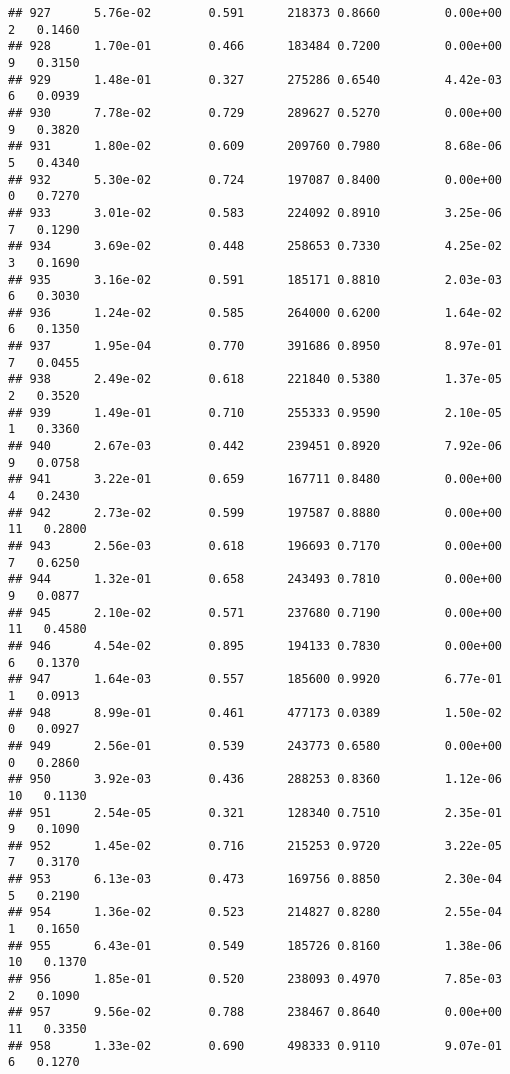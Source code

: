\documentclass[
]{article}
\begin{document}
\begin{verbatim}
## 927      5.76e-02        0.591      218373 0.8660         0.00e+00   2   0.1460
## 928      1.70e-01        0.466      183484 0.7200         0.00e+00   9   0.3150
## 929      1.48e-01        0.327      275286 0.6540         4.42e-03   6   0.0939
## 930      7.78e-02        0.729      289627 0.5270         0.00e+00   9   0.3820
## 931      1.80e-02        0.609      209760 0.7980         8.68e-06   5   0.4340
## 932      5.30e-02        0.724      197087 0.8400         0.00e+00   0   0.7270
## 933      3.01e-02        0.583      224092 0.8910         3.25e-06   7   0.1290
## 934      3.69e-02        0.448      258653 0.7330         4.25e-02   3   0.1690
## 935      3.16e-02        0.591      185171 0.8810         2.03e-03   6   0.3030
## 936      1.24e-02        0.585      264000 0.6200         1.64e-02   6   0.1350
## 937      1.95e-04        0.770      391686 0.8950         8.97e-01   7   0.0455
## 938      2.49e-02        0.618      221840 0.5380         1.37e-05   2   0.3520
## 939      1.49e-01        0.710      255333 0.9590         2.10e-05   1   0.3360
## 940      2.67e-03        0.442      239451 0.8920         7.92e-06   9   0.0758
## 941      3.22e-01        0.659      167711 0.8480         0.00e+00   4   0.2430
## 942      2.73e-02        0.599      197587 0.8880         0.00e+00  11   0.2800
## 943      2.56e-03        0.618      196693 0.7170         0.00e+00   7   0.6250
## 944      1.32e-01        0.658      243493 0.7810         0.00e+00   9   0.0877
## 945      2.10e-02        0.571      237680 0.7190         0.00e+00  11   0.4580
## 946      4.54e-02        0.895      194133 0.7830         0.00e+00   6   0.1370
## 947      1.64e-03        0.557      185600 0.9920         6.77e-01   1   0.0913
## 948      8.99e-01        0.461      477173 0.0389         1.50e-02   0   0.0927
## 949      2.56e-01        0.539      243773 0.6580         0.00e+00   0   0.2860
## 950      3.92e-03        0.436      288253 0.8360         1.12e-06  10   0.1130
## 951      2.54e-05        0.321      128340 0.7510         2.35e-01   9   0.1090
## 952      1.45e-02        0.716      215253 0.9720         3.22e-05   7   0.3170
## 953      6.13e-03        0.473      169756 0.8850         2.30e-04   5   0.2190
## 954      1.36e-02        0.523      214827 0.8280         2.55e-04   1   0.1650
## 955      6.43e-01        0.549      185726 0.8160         1.38e-06  10   0.1370
## 956      1.85e-01        0.520      238093 0.4970         7.85e-03   2   0.1090
## 957      9.56e-02        0.788      238467 0.8640         0.00e+00  11   0.3350
## 958      1.33e-02        0.690      498333 0.9110         9.07e-01   6   0.1270

\end{verbatim}
\end{document}
